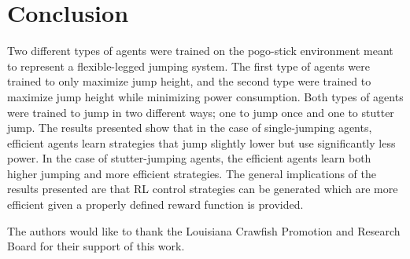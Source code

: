 \documentclass{ifacconf}
\begin{document}
   
\section{Conclusion}
   Two different types of agents were trained on the pogo-stick environment meant to represent a flexible-legged jumping system. The first type of agents were trained to only maximize jump height, and the second type were trained to maximize jump height while minimizing power consumption. Both types of agents were trained to jump in two different ways; one to jump once and one to stutter jump. The results presented show that in the case of single-jumping agents, efficient agents learn strategies that jump slightly lower but use significantly less power. In the case of stutter-jumping agents, the efficient agents learn both higher jumping and more efficient strategies. The general implications of the results presented are that RL control strategies can be generated which are more efficient given a properly defined reward function is provided.

\begin{ack}
   The authors would like to thank the Louisiana Crawfish Promotion and Research Board for their support of this work.
\end{ack}

% 

\end{document}
